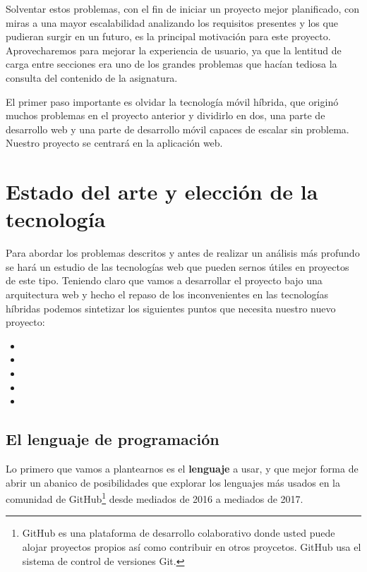 \bigskip 
Solventar estos problemas, con el fin de iniciar un proyecto mejor planificado, con miras a una mayor escalabilidad analizando los requisitos presentes y los que pudieran surgir en un futuro, es la principal motivación para este proyecto. Aprovecharemos para mejorar la experiencia de usuario, ya que la lentitud de carga entre secciones era uno de los grandes problemas que hacían tediosa la consulta del contenido de la asignatura.

\bigskip
El primer paso importante es olvidar la tecnología móvil híbrida, que originó muchos problemas en el proyecto anterior y dividirlo en dos, una parte de desarrollo web y una parte de desarrollo móvil capaces de escalar sin problema. Nuestro proyecto se centrará en la aplicación web.


\section{Estado del arte y elección de la tecnología}
Para abordar los problemas descritos y antes de realizar un análisis más profundo se hará un estudio de las tecnologías web que pueden sernos útiles en proyectos de este tipo. Teniendo claro que vamos a desarrollar el proyecto bajo una arquitectura web y hecho el repaso de los inconvenientes en las tecnologías híbridas podemos sintetizar los siguientes puntos que necesita nuestro nuevo proyecto:

\begin{itemize}
  \item {}
  \item {}
  \item {}
  \item {}
  \item {}
\end{itemize}

\subsection{El lenguaje de programación}

\bigskip 
Lo primero que vamos a plantearnos es el \textbf{lenguaje} a usar, y que mejor forma de abrir un abanico de posibilidades que explorar los lenguajes más usados en la comunidad de GitHub\footnote{GitHub es una plataforma de desarrollo colaborativo donde usted puede alojar proyectos propios así como contribuir en otros proycetos. GitHub usa el sistema de control de versiones Git.} desde mediados de 2016 a mediados de 2017.

